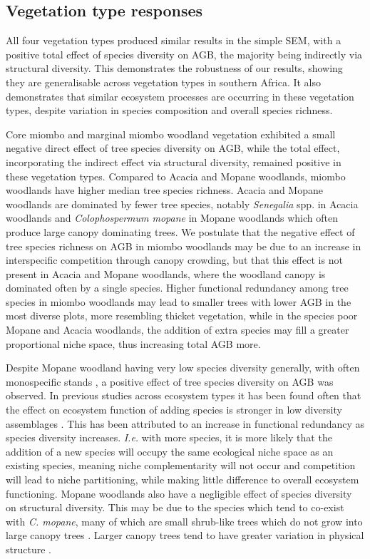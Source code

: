\documentclass[11pt,a4paper]{article}
\begin{document}
\subsection{Vegetation type responses}

All four vegetation types produced similar results in the simple SEM, with a positive total effect of species diversity on AGB, the majority being indirectly via structural diversity. This demonstrates the robustness of our results, showing they are generalisable across vegetation types in southern Africa. It also demonstrates that similar ecosystem processes are occurring in these vegetation types, despite variation in species composition and overall species richness.

Core miombo and marginal miombo woodland vegetation exhibited a small negative direct effect of tree species diversity on AGB, while the total effect, incorporating the indirect effect via structural diversity, remained positive in these vegetation types. Compared to Acacia and Mopane woodlands, miombo woodlands have higher median tree species richness. Acacia and Mopane woodlands are dominated by fewer tree species, notably \textit{Senegalia} spp. in Acacia woodlands and \textit{Colophospermum mopane} in Mopane woodlands which often produce large canopy dominating trees. We postulate that the negative effect of tree species richness on AGB in miombo woodlands may be due to an increase in interspecific competition through canopy crowding, but that this effect is not present in Acacia and Mopane woodlands, where the woodland canopy is dominated often by a single species. Higher functional redundancy among tree species in miombo woodlands may lead to smaller trees with lower AGB in the most diverse plots, more resembling thicket vegetation, while in the species poor Mopane and Acacia woodlands, the addition of extra species may fill a greater proportional niche space, thus increasing total AGB more. 

Despite Mopane woodland having very low species diversity generally, with often monospecific stands \citep{Timberlake2010}, a positive effect of tree species diversity on AGB was observed. In previous studies across ecosystem types it has been found often that the effect on ecosystem function of adding species is stronger in low diversity assemblages \citep{Hector2007}. This has been attributed to an increase in functional redundancy as species diversity increases. \textit{I.e.} with more species, it is more likely that the addition of a new species will occupy the same ecological niche space as an existing species, meaning niche complementarity will not occur and competition will lead to niche partitioning, while making little difference to overall ecosystem functioning. Mopane woodlands also have a negligible effect of species diversity on structural diversity. This may be due to the species which tend to co-exist with \textit{C. mopane}, many of which are small shrub-like trees which do not grow into large canopy trees \citep{Timberlake2010}. Larger canopy trees tend to have greater variation in physical structure \citep{Seidel2019}.
\end{document}
